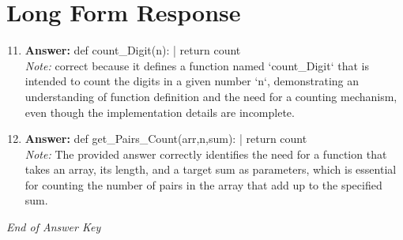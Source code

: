 \documentclass[12pt]{article}
\begin{document}
\section*{Long Form Response}
\begin{enumerate}[label=\arabic*.]
\setcounter{enumi}{10}
\item \textbf{Answer:} def count\_Digit(n): | return count
\\ \textit{Note:} correct because it defines a function named `count\_Digit` that is intended to count the digits in a given number `n`, demonstrating an understanding of function definition and the need for a counting mechanism, even though the implementation details are incomplete.
\item \textbf{Answer:} def get\_Pairs\_Count(arr,n,sum): | return count
\\ \textit{Note:} The provided answer correctly identifies the need for a function that takes an array, its length, and a target sum as parameters, which is essential for counting the number of pairs in the array that add up to the specified sum.
\end{enumerate}

\vfill
\noindent\textit{End of Answer Key}
\end{document}
